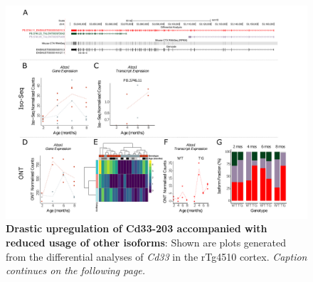 \begin{landscape}
	\begin{figure}[htp]
		\begin{center}
			\includegraphics[page=7,trim={0 0.5cm 0 1.5cm},scale =0.85]{Figures/TargetGene_DifferentialAnalysis.pdf}
		\end{center}
		\captionsetup{width=1.5\textwidth}
		\caption[Drastic upregulation of Cd33-203 accompanied with reduced usage of other isoforms]%
		{\textbf{Drastic upregulation of Cd33-203 accompanied with reduced usage of other isoforms}: Shown are plots generated from the differential analyses of \textit{Cd33} in the rTg4510 cortex. \textit{Caption continues on the following page.}}   
		\label{fig:cd33_diff_analysis}
	\end{figure}
\end{landscape}
